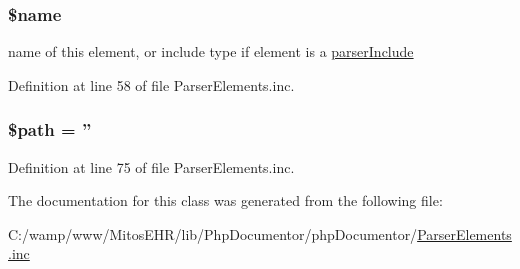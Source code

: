 \hypertarget{classparser_element_ab2fc40d43824ea3e1ce5d86dee0d763b}{
\subsubsection[{\$name}]{\setlength{\rightskip}{0pt plus 5cm}\$name}}\label{classparser_element_ab2fc40d43824ea3e1ce5d86dee0d763b}
name of this element, or include type if element is a \hyperlink{classparser_include}{parser\-Include} 

\-Definition at line 58 of file \-Parser\-Elements.\-inc.

\hypertarget{classparser_element_a0a4baf0b22973c07685c3981f0d17fc4}{
\subsubsection[{\$path}]{\setlength{\rightskip}{0pt plus 5cm}\$path = ''}}\label{classparser_element_a0a4baf0b22973c07685c3981f0d17fc4}


\-Definition at line 75 of file \-Parser\-Elements.\-inc.



\-The documentation for this class was generated from the following file\-:\begin{DoxyCompactItemize}
\item 
\-C\-:/wamp/www/\-Mitos\-E\-H\-R/lib/\-Php\-Documentor/php\-Documentor/\hyperlink{_parser_elements_8inc}{\-Parser\-Elements.\-inc}\end{DoxyCompactItemize}
